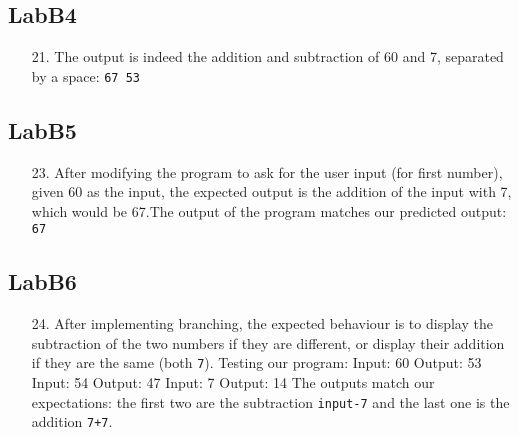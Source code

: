 \documentclass{article}
\begin{document}
\subsection{LabB4}
\begin{enumerate}
\item[21. ] The output is indeed the addition and subtraction of 60 and 7, separated by a space: \verb$67 53$
\end{enumerate}

\subsection{LabB5}
\begin{enumerate}
\item[23. ] After modifying the program to ask for the user input (for first number), given 60 as the input, the expected output is the addition of the input with 7, which would be 67.\newline The output of the program matches our predicted output: \verb$67$
\end{enumerate}

\subsection{LabB6}
\begin{enumerate}
\item[24. ] After implementing branching, the expected behaviour is to display the subtraction of the two numbers if they are different, or display their addition if they are the same (both \verb$7$).
\newline
\newline
Testing our program:
\newline
\newline
Input: 60 \newline
Output: 53
\newline
\newline
Input: 54 \newline
Output: 47
\newline
\newline
Input: 7 \newline
Output: 14
\newline
\newline
The outputs match our expectations: the first two are the subtraction \verb$input-7$ and the last one is the addition \verb$7+7$.
\end{enumerate}
\end{document}
